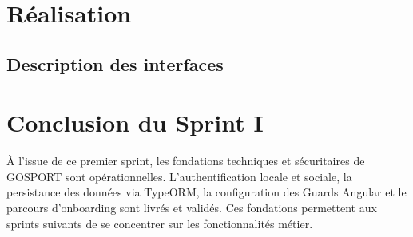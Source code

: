 \section{Réalisation}

\subsection{Description des interfaces}

\section*{Conclusion du Sprint I}
\mtcaddsection
{}
À l'issue de ce premier sprint, les fondations techniques et sécuritaires de GOSPORT sont opérationnelles. L'authentification locale et sociale, la persistance des données via TypeORM, la configuration des Guards Angular et le parcours d'onboarding sont livrés et validés. Ces fondations permettent aux sprints suivants de se concentrer sur les fonctionnalités métier.
